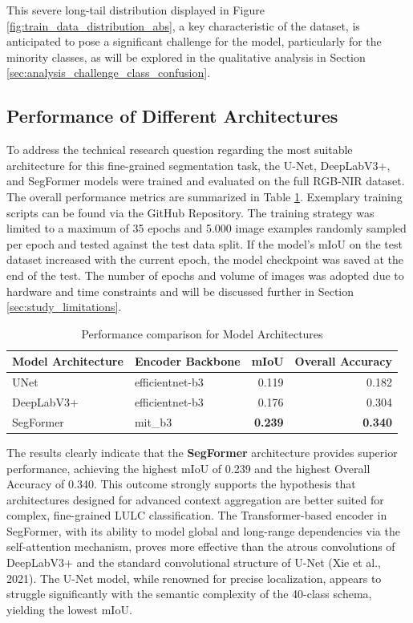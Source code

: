 \documentclass{report}
\begin{document}
This severe long-tail distribution displayed in Figure \ref{fig:train_data_distribution_abs}, a key characteristic of the dataset, is anticipated to pose a significant challenge for the model, particularly for the minority classes, as will be explored in the qualitative analysis in Section \ref{sec:analysis_challenge_class_confusion}.


\subsection{Performance of Different Architectures}
To address the technical research question regarding the most suitable architecture for this fine-grained segmentation task, the U-Net, DeepLabV3+, and SegFormer models were trained and evaluated on the full RGB-NIR dataset. The overall performance metrics are summarized in Table \ref{tab:performance_model_architectures}. Exemplary training scripts can be found via the GitHub Repository. The training strategy was limited to a maximum of 35 epochs and 5.000 image examples randomly sampled per epoch and tested against the test data split. If the model's mIoU on the test dataset increased with the current epoch, the model checkpoint was saved at the end of the test. The number of epochs and volume of images was adopted due to hardware and time constraints and will be discussed further in Section \ref{sec:study_limitations}. \par
\begin{table}[H]
\centering
\caption{Performance comparison for Model Architectures}
\label{tab:performance_model_architectures}
\begin{tabular}{llrr}
\toprule
Model Architecture & Encoder Backbone & mIoU & Overall Accuracy \\
\midrule
UNet & efficientnet-b3 & 0.119 & 0.182 \\
DeepLabV3+ & efficientnet-b3 & 0.176 & 0.304 \\
SegFormer & mit\_b3 & \textbf{0.239} & \textbf{0.340} \\
\bottomrule
\end{tabular}
\end{table}
The results clearly indicate that the \textbf{SegFormer} architecture provides superior performance, achieving the highest mIoU of 0.239 and the highest Overall Accuracy of 0.340. This outcome strongly supports the hypothesis that architectures designed for advanced context aggregation are better suited for complex, fine-grained LULC classification. The Transformer-based encoder in SegFormer, with its ability to model global and long-range dependencies via the self-attention mechanism, proves more effective than the atrous convolutions of DeepLabV3+ and the standard convolutional structure of U-Net (Xie et al., 2021). The U-Net model, while renowned for precise localization, appears to struggle significantly with the semantic complexity of the 40-class schema, yielding the lowest mIoU. \par
\end{document}
